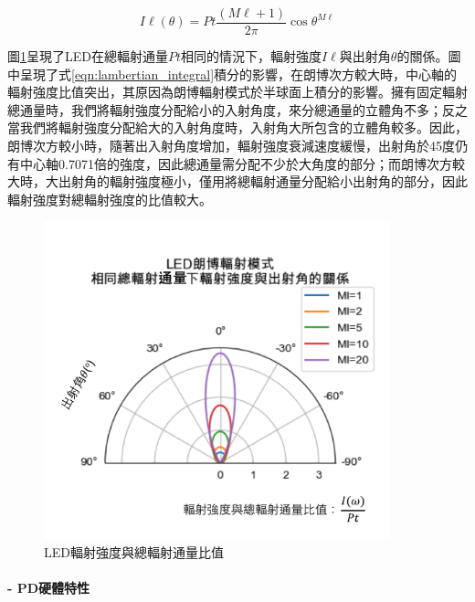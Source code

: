                 \begin{equation}
                    \label{eqn:lambertian_led}
                    I\ell(\theta)=Pt\frac{(M\ell+1)}{2 \pi} \cos \theta^{M\ell}
                \end{equation}

                圖\ref{pic:lambertian_led}呈現了LED在總輻射通量$Pt$相同的情況下，輻射強度$I\ell$與出射角$\theta$的關係。圖中呈現了式\ref{eqn:lambertian_integral}積分的影響，在朗博次方較大時，中心軸的輻射強度比值突出，其原因為朗博輻射模式於半球面上積分的影響。擁有固定輻射總通量時，我們將輻射強度分配給小的入射角度，來分總通量的立體角不多；反之當我們將輻射強度分配給大的入射角度時，入射角大所包含的立體角較多。因此，朗博次方較小時，隨著出入射角度增加，輻射強度衰減速度緩慢，出射角於45度仍有中心軸0.7071倍的強度，因此總通量需分配不少於大角度的部分；而朗博次方較大時，大出射角的輻射強度極小，僅用將總輻射通量分配給小出射角的部分，因此輻射強度對總輻射強度的比值較大。

                \begin{figure}[htpb]
                    \centering
                    \includegraphics[width=10cm]{ch2pic/lambertian_led.png}
                    \caption{LED輻射強度與總輻射通量比值}
                    \label{pic:lambertian_led}
                \end{figure}




                \paragraph*{- PD硬體特性}

                \hfill
                
